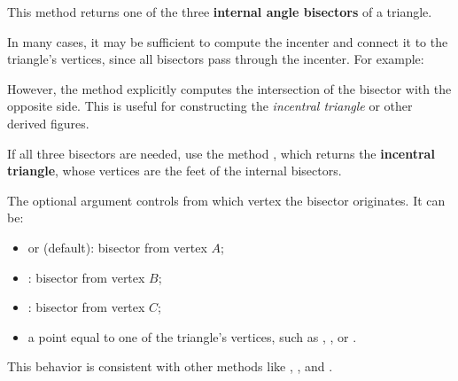 This method returns one of the three \textbf{internal angle bisectors} of a triangle.

\medskip
\noindent
In many cases, it may be sufficient to compute the incenter and connect it to the triangle’s vertices, since all bisectors pass through the incenter. For example:
\begin{mybox}
\end{mybox}

\noindent
However, the method  explicitly computes the intersection of the bisector with the opposite side. This is useful for constructing the \emph{incentral triangle} or other derived figures.

\medskip
\noindent
If all three bisectors are needed, use the method , which returns the \textbf{incentral triangle}, whose vertices are the feet of the internal bisectors.

\medskip
\noindent
The optional argument  controls from which vertex the bisector originates. It can be:
\begin{itemize}
  \item {} or  (default): bisector from vertex $A$;
  \item {}: bisector from vertex $B$;
  \item {}: bisector from vertex $C$;
  \item a point equal to one of the triangle’s vertices, such as , , or .
\end{itemize}

\noindent
This behavior is consistent with other methods like , , and .

